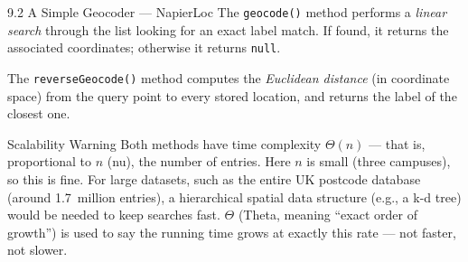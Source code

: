\documentclass[aspectratio=169,10pt]{beamer}
\begin{document}
\begin{frame}[allowframebreaks]{9.2 A Simple Geocoder --- NapierLoc}
  \medskip
  The \texttt{geocode()} method performs a \emph{linear search} through
  the list looking for an exact label match.  If found, it returns the
  associated coordinates; otherwise it returns \texttt{null}.

  The \texttt{reverseGeocode()} method computes the \emph{Euclidean distance}
  (in coordinate space) from the query point to every stored location, and
  returns the label of the closest one.

  \begin{alertblock}{Scalability Warning}
    Both methods have time complexity $\Theta(n)$ --- that is, proportional
    to $n$ (nu), the number of entries.  Here $n$ is small (three campuses),
    so this is fine.  For large datasets, such as the entire UK postcode
    database (around 1.7~million entries), a hierarchical spatial data
    structure (e.g., a k-d tree) would be needed to keep searches fast.
    $\Theta$ (Theta, meaning ``exact order of growth'') is used to say the
    running time grows at exactly this rate --- not faster, not slower.
  \end{alertblock}

\end{frame}
\end{document}

